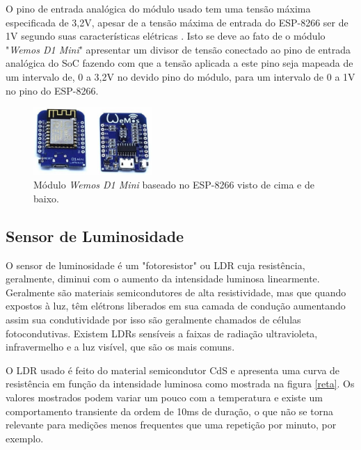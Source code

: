 O pino de entrada analógica do módulo usado tem uma tensão máxima especificada de 3,2V, apesar de a tensão máxima de entrada do ESP-8266 ser de 1V segundo suas características elétricas \cite{esp}. Isto se deve ao fato de o módulo "\textit{Wemos D1 Mini}" apresentar um divisor de tensão conectado ao pino de entrada analógica do SoC fazendo com que a tensão aplicada a este pino seja mapeada de um intervalo de, 0 a 3,2V no devido pino do módulo, para um intervalo de 0 a 1V no pino do ESP-8266.

\begin{figure}[ht]
    \begin{center}
    \includegraphics[width=0.4\textwidth]{figuras/wemos.PNG}
    \end{center}
    \caption[Ilustração do módulo \textit{Wemos D1 Mini}.]{Módulo \textit{Wemos D1 Mini} baseado no ESP-8266 visto de cima e de baixo.}
    \label{wemos}
\end{figure}

\subsection{Sensor de Luminosidade}

O sensor de luminosidade é um "fotoresistor" ou \acf{LDR} cuja resistência, geralmente, diminui com o aumento da intensidade luminosa linearmente. Geralmente são materiais semicondutores de alta resistividade, mas que quando expostos à luz, têm elétrons liberados em sua camada de condução aumentando assim sua condutividade por isso são geralmente chamados de células fotocondutivas. Existem LDRs sensíveis a faixas de radiação ultravioleta, infravermelho e a luz visível, que são os mais comuns.

O LDR usado \cite{ldr} é feito do material semicondutor CdS e apresenta uma curva de resistência em função da intensidade luminosa como mostrada na figura \ref{reta}. Os valores mostrados podem variar um pouco com a temperatura e existe um comportamento transiente da ordem de 10ms de duração, o que não se torna relevante para medições menos frequentes que uma repetição por minuto, por exemplo.

